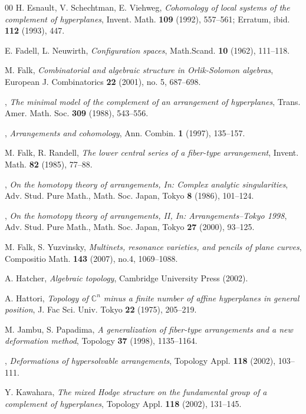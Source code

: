 \documentclass[psamsfonts]{conm-p-l}
\theoremstyle{definition}
\theoremstyle{remark}
\numberwithin{equation}{section}
\newcommand{\C}{\mathbb{C}}
\begin{document}
\begin{thebibliography}{00}
 H. Esnault, V. Schechtman, E. Viehweg,
\textit{ Cohomology of local systems of the complement of hyperplanes},
Invent. Math. \textbf{109} (1992), 557--561; Erratum, 
ibid. \textbf{112} (1993), 447.

 E. Fadell, L.  Neuwirth,
\textit{ Configuration spaces}, Math.Scand. \textbf{10} (1962), 111--118.

 M. Falk,
\textit{ Combinatorial and algebraic structure in Orlik-Solomon algebras}, European J. Combinatorics \textbf{22} (2001), no. 5, 687--698.

 \bysame,
\textit{ The minimal model of the complement of an arrangement
of hyperplanes}, Trans. Amer. Math. Soc. \textbf{309} (1988), 543--556.

 \bysame,
\textit{ Arrangements and cohomology}, Ann. Combin. \textbf{1} (1997), 135--157.

 M. Falk, R. Randell,
\textit{ The lower central series of a fiber-type arrangement},
Invent. Math. \textbf{82} (1985), 77--88.

  \bysame,
\textit{ On the homotopy theory of arrangements, In: Complex analytic singularities}, Adv. Stud. Pure Math., Math. Soc. Japan, Tokyo \textbf{8} (1986), 101--124.

  \bysame,
\textit{ On the homotopy theory of arrangements, II, In: Arrangements--Tokyo 1998}, Adv. Stud. Pure Math., Math. Soc. Japan, Tokyo \textbf{27} (2000), 93--125.

 M. Falk, S. Yuzvinsky,
\textit{ Multinets, resonance varieties, and pencils of plane curves},
Compositio Math. \textbf{143} (2007), no.4, 1069--1088.


 A. Hatcher,
\textit{ Algebraic topology},
Cambridge University Press (2002).

 A. Hattori,
\textit{ Topology of $\C^n$ minus a finite number of
affine hyperplanes in general position},
J. Fac Sci. Univ. Tokyo \textbf{22} (1975), 205--219.

 M. Jambu, S. Papadima,
\textit{ A generalization of fiber-type arrangements and
a new deformation method}, Topology \textbf{37}
(1998), 1135--1164.

 \bysame, \textit{ Deformations of hypersolvable
arrangements},
Topology Appl. \textbf{118} (2002), 103--111.

 Y. Kawahara,
\textit{ The mixed Hodge structure on the fundamental group of a complement of hyperplanes},
Topology Appl. \textbf{118} (2002), 131--145.


\end{thebibliography}
\end{document}
